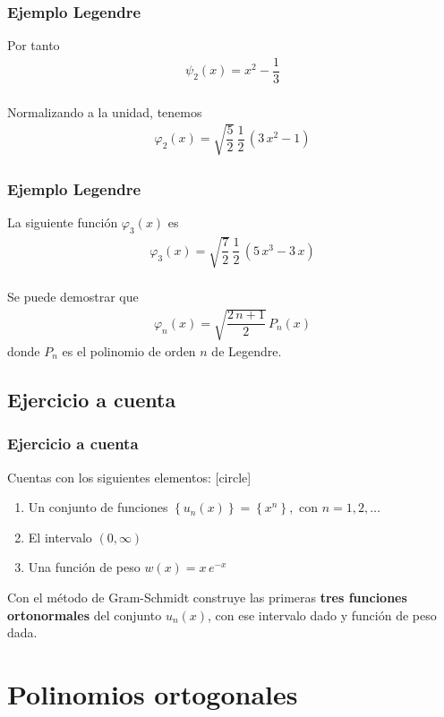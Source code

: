 \begin{frame}
\frametitle{Ejemplo Legendre}
Por tanto
\begin{align}
\psi_{2}(x) = x^{2} - \dfrac{1}{3}
\label{eq:ecuacion_10_57}
\end{align}
\\
\bigskip
\pause
Normalizando a la unidad, tenemos
\begin{align}
\varphi_{2} (x) = \sqrt{\dfrac{5}{2}} \, \dfrac{1}{2} \, (3 \, x^{2} - 1)
\label{eq:ecuacion_10_58}
\end{align}
\end{frame}
\begin{frame}
\frametitle{Ejemplo Legendre}
La siguiente función $\varphi_{3}(x)$ es
\begin{align}
\varphi_{3} (x) = \sqrt{\dfrac{7}{2}} \, \dfrac{1}{2} \, (5 \, x^{3} - 3 \, x)
\label{eq:ecuacion_10_59}
\end{align}
\\
\bigskip
\pause
Se puede demostrar que
\begin{align}
\varphi_{n}(x) = \sqrt{\dfrac{2 \, n + 1}{2}} \, P_{n}(x)
\label{eq:ecuacion_10_60}
\end{align}
donde $P_{n}$ es el polinomio de orden $n$ de Legendre.
\end{frame}
\subsection{Ejercicio a cuenta}
\begin{frame}
\frametitle{Ejercicio a cuenta}
Cuentas con los siguientes elementos:
[circle]
\begin{enumerate}
\item Un conjunto de funciones $\left\{ u_{n} (x) \right\} = \left\{ x^{n} \right\}, \mbox{ con } n = 1, 2, \ldots$
\item El intervalo $(0, \infty)$
\item Una función de peso $w(x) = x \, e^{-x}$
\end{enumerate}
Con el método de Gram-Schmidt construye las primeras \textbf{tres funciones ortonormales} del conjunto $u_{n}(x)$, con ese intervalo dado y función de peso dada.
\end{frame}
\section{Polinomios ortogonales}
